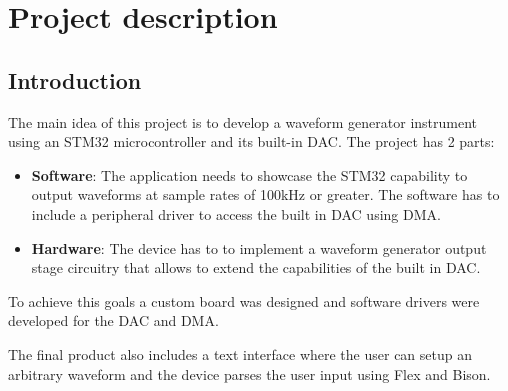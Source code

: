 \section{Project description}

\subsection{Introduction}

The main idea of this project is to develop a waveform generator instrument using an STM32 microcontroller and its built-in DAC. The project has 2 parts:
\begin{itemize}
      \item \textbf{Software}: The application needs to showcase the STM32 capability to output
            waveforms  at sample rates of 100kHz or greater. The software has to include a
            peripheral driver to access the built in DAC using DMA.
      \item \textbf{Hardware}: The device has to to implement a waveform generator output stage
            circuitry that allows to extend the capabilities of the built in DAC.
\end{itemize}

To achieve this goals a custom board was designed and software drivers were developed for the DAC and DMA.

The final product also includes a text interface where the user can setup an arbitrary waveform and the device parses the user input using Flex and Bison.

